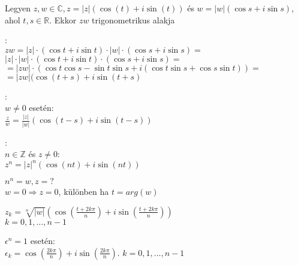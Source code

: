 \begin{frame}
\begin{tcolorbox}[title={Def.: Moivre azonosságok}]
Legyen $z, w \in \mathbb{C}, z = |z|({\cos}(t) + i{\sin}(t))$ és $w = |w|({\cos}s + i {\sin}s)$, ahol $t, s \in \mathbb{R}$. Ekkor $zw$ trigonometrikus alakja\\
\mbigskip

:\\
$zw = |z| \cdot ({\cos}t + i{\sin}t) \cdot |w| \cdot ({\cos}s + i{\sin}s) =$\\
$|z| \cdot |w| \cdot ({\cos}t + i{\sin}t) \cdot ({\cos}s + i{\sin}s) =$\\
$= |zw| \cdot ({\cos}t{\cos}s - {\sin}t{\sin}s + i({\cos}t{\sin}s + {\cos}s{\sin}t)) =$\\
$= |zw|({\cos}(t + s) + i{\sin}(t + s)$\\
\mbigskip

:\\
$w \neq 0$ esetén:\\
$\frac{z}{w} = \frac{|z|}{|w|}({\cos}(t - s) + i {\sin}(t - s))$\\
\mbigskip

:\\
$n \in \mathbb{Z}$ és $z \neq 0$:\\
$z^n = |z|^n({\cos}(nt) + i{\sin}(nt))$
\end{tcolorbox}

\begin{tcolorbox}[title={Def.: Gyökvonás komplex számokból}]
$n^n = w, z = ?$\\
$w = 0 \Rightarrow z = 0$, különben ha $t = arg(w)$\\
\msmallskip

$z_k = \sqrt[n]{|w|}({\cos}(\frac{t + 2k{\pi}}{n}) + i{\sin}(\frac{t + 2k{\pi}}{n}))$\\
$k = 0, 1, ..., n - 1$\\
\mbigskip

 ${\epsilon}^n = 1$ esetén:\\
${\epsilon}_k = {\cos}(\frac{2k{\pi}}{n}) + i{\sin}(\frac{2k{\pi}}{n})$. $k = 0, 1, ..., n - 1$
\end{tcolorbox}
\end{frame}

